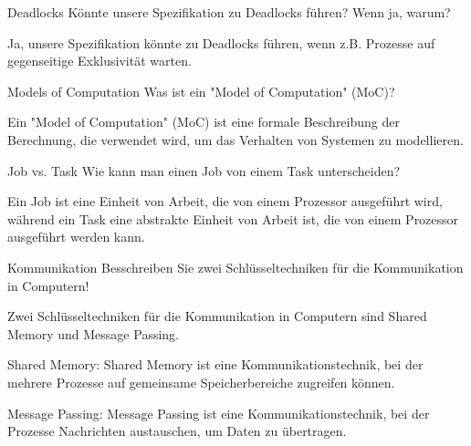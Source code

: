 \documentclass{article}
\begin{document}
\begin{exercise}{Deadlocks}
  Könnte unsere Spezifikation zu Deadlocks führen? Wenn ja, warum?

  \begin{solution}
    Ja, unsere Spezifikation könnte zu Deadlocks führen, wenn z.B. Prozesse auf gegenseitige Exklusivität warten.
  \end{solution}
\end{exercise}

\begin{exercise}{Models of Computation}
  Was ist ein "Model of Computation" (MoC)?

  \begin{solution}
    Ein "Model of Computation" (MoC) ist eine formale Beschreibung der Berechnung, die verwendet wird, um das Verhalten von Systemen zu modellieren.
  \end{solution}
\end{exercise}

\begin{exercise}{Job vs. Task}
  Wie kann man einen Job von einem Task unterscheiden?

  \begin{solution}
    Ein Job ist eine Einheit von Arbeit, die von einem Prozessor ausgeführt wird, während ein Task eine abstrakte Einheit von Arbeit ist, die von einem Prozessor ausgeführt werden kann.
  \end{solution}
\end{exercise}

\begin{exercise}{Kommunikation}
  Besschreiben Sie zwei Schlüsseltechniken für die Kommunikation in Computern!

  \begin{solution}
    Zwei Schlüsseltechniken für die Kommunikation in Computern sind Shared Memory und Message Passing.

    Shared Memory: Shared Memory ist eine Kommunikationstechnik, bei der mehrere Prozesse auf gemeinsame Speicherbereiche zugreifen können.

    Message Passing: Message Passing ist eine Kommunikationstechnik, bei der Prozesse Nachrichten austauschen, um Daten zu übertragen.
  \end{solution}
\end{exercise}
\end{document}
